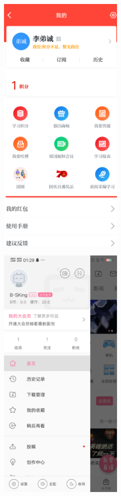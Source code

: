 \documentclass{article}
\begin{document}
\begin{itemize}
\begin{figure}[H]
    \end{figure}
    \begin{figure}[H]
	\centering
	\includegraphics[width=6cm]{Screenshot_2020_0103_013207.png}
	\label{figupc}
	
\end{figure}
    \begin{figure}[H]
	\centering
	\includegraphics[width=6cm]{Screenshot_2020_0103_012920.png}
	\label{figupc}
	

\end{figure}
\end{itemize}
\end{document}
